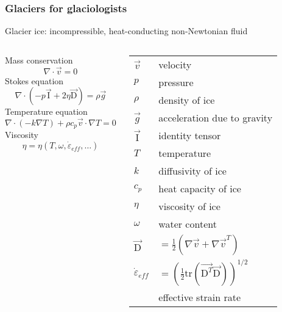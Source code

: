 \documentclass[notes=hide]{beamer}
\begin{document}
\begin{frame}
  \frametitle{Glaciers for glaciologists}
  \vspace{-.1cm}
  Glacier ice: incompressible, heat-conducting non-Newtonian fluid
  \vspace{.1cm}
  \small{
  \begin{columns}
  \column[T]{6cm}
  Mass conservation
  \begin{displaymath}
  \nabla \cdot \vec v =  0
  \end{displaymath}
  Stokes equation
  \begin{displaymath}
  \nabla \cdot \left( -p\vec{\mathrm I} + 2\eta \vec {\mathrm D}\right) = \rho \vec g
  \end{displaymath}
  Temperature equation
  \begin{displaymath}
  \nabla \cdot \left(-k\nabla T\right) + \rho c_p \vec v \cdot \nabla T = 0
  \end{displaymath}
    Viscosity
  \begin{displaymath}
  \eta = \eta\left(T,\omega,\dot \varepsilon_{eff},\ldots \right)
  \end{displaymath}
  \column[T]{5cm}
    \small
    \begin{table}
    \begin{tabular}{ll}
      $\vec v$ & velocity \\
      $p$ & pressure \\
      $\rho$&  density of ice \\
      $\vec g$ & acceleration due to gravity \\
      $\vec {\mathrm I}$ & identity tensor \\
      $T$ & temperature \\
      $k$ & diffusivity of ice \\
      $c_p$ & heat capacity of ice \\
      $\eta$ & viscosity of ice \\
      $\omega$ & water content \\
      $\vec {\mathrm D}$ & $=\frac{1}{2}\left( \nabla \vec v + \nabla \vec v^{T}\right)$\\
      $\dot \varepsilon_{eff}$ & $=\left(\frac{1}{2}\mathrm{tr} \left(\vec {\mathrm D^T}\vec {\mathrm D}\right)\right)^{1/2}$\\
      & effective strain rate
    \end{tabular}
  \end{table}
  \end{columns}
  }
\end{frame}



\end{document}
